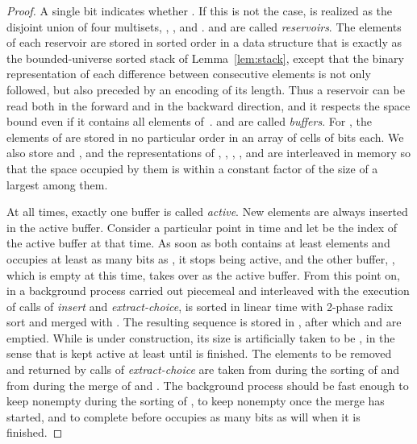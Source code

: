\documentclass[envcountsame,envcountsect,undated,nolinenumbers]{lnthi}
\def\Tvn#1{\hbox{\textit{#1\/}}}
\begin{document}
\begin{proof}
A single bit indicates whether .
If this is not the case,  is realized as the disjoint union
of four multisets,
, ,  and .
 and  are called \emph{reservoirs}.
The elements of each reservoir are stored
in sorted order in a data structure that is
exactly as the bounded-universe sorted stack
of Lemma~\ref{lem:stack}, except that the
binary representation of each
difference between consecutive elements
is not only followed, but also
preceded by an encoding of its length.
Thus a reservoir can be read both in the
forward and in the backward direction,
and it respects the space bound even if
it contains all  elements of~.
 and  are called \emph{buffers}.
For , the elements of 
are stored in no
particular order in an array of  cells
of  bits each.
We also store  and , and the representations
of , , , ,
 and  are interleaved in
memory so that the space occupied by them is within
a constant factor of the size of a largest among them.

At all times, exactly one buffer is called \emph{active}.
New elements are always inserted in the active buffer.
Consider a particular point in time and
let  be the index of the active
buffer at that time.
As soon as  both contains at least
 elements and occupies at least as many
bits as , it stops
being active, and the other buffer, ,
which is empty at this time, takes over as the active buffer.
From this point on, in a background process carried out
piecemeal and interleaved with the execution of
calls of \Tvn{insert} and \Tvn{extract-choice},
 is sorted in linear time with
2-phase radix sort and merged with .
The resulting sequence is stored in ,
after which  and  are emptied.
While  is under construction, its size
is artificially taken to be , in the sense
that  is kept active at least until
 is finished.
The elements to be removed and returned by calls
of \Tvn{extract-choice} are taken from 
during the sorting of  and from
 during the merge of  and .
The background process should be fast enough
to keep  nonempty during the sorting of ,
to keep  nonempty once the
merge has started, and to complete before
 occupies as many bits as 
will when it is finished.


\end{proof}
\end{document}
